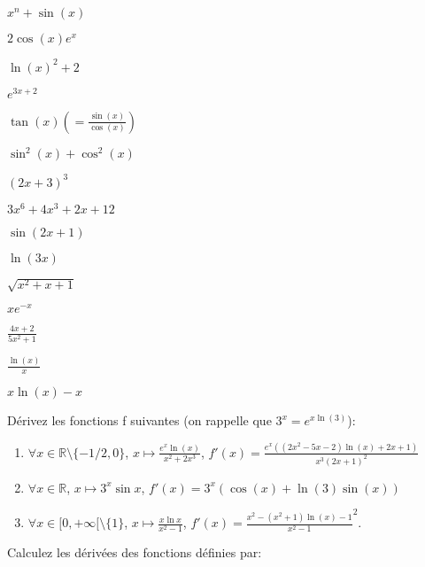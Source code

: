 \documentclass[11pt,a4paper]{amsart}
\theoremstyle{theorem}
\theoremstyle{definition}
\def\RR{{\mathbb R}}
\begin{document}
{\begin{enumerate}
\begin{multicols}{2}
\item $x^n+\sin(x)$ 
\item $2\cos(x)e^x$
\item $\ln(x)^2+2$
\item $e^{3x+2}$
\item $\tan(x) \left(=\frac{\sin(x)}{\cos(x)} \right)$
\item $\sin^2(x)+\cos^2(x)$
\item $(2x+3)^3$
\item $3x^6+ 4x^3 + 2x +12$
\item $\sin(2x+1)$
\item $\ln(3x)$
\item $\sqrt{x^2+x+1}$
\item $xe^{-x}$
\item $\frac{4x+2}{5x^2+1}$
\item $\frac{\ln(x)}{x}$
\item $ x\ln (x)-x$
\end{multicols}
\end{enumerate}





\begin{exo}{}{}
Dérivez les fonctions f suivantes (on rappelle que $3^x=e^{x\ln(3)}$): 

\begin{enumerate}
\item $\forall x \in \RR  \setminus \lbrace-1/2,0 \rbrace$, $x\mapsto  \frac{e^x \ln(x) }{x^2+2x^3}$, $f'(x) = \frac{e^x ((2 x^2-5 x-2) \ln(x)+2 x+1)}{x^3 (2 x+1)^2}$
\item $\forall x \in \RR $, $x\mapsto  3^x \sin x $, $f'(x)=3^x (\cos(x)+\ln(3) \sin(x))$
\item $\forall x \in \lbrack 0,+ \infty \lbrack \setminus \lbrace{ 1 \rbrace} $, $x\mapsto  \frac{x\ln x}{x^2-1}$, $f'(x)= \frac{x^2-(x^2+1) \ln(x)-1}{x^2-1}^2$.
\end{enumerate}
\end{exo}


\begin{exo}{}{}
Calculez les dérivées des fonctions définies par:



\end{exo}}
\end{document}
